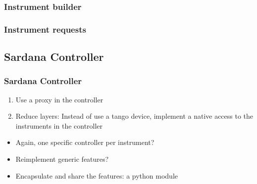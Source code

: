 \documentclass{beamer}
\begin{document}
\begin{frame}
  \frametitle{Instrument builder}
\end{frame}

\begin{frame}
  \frametitle{Instrument requests}
\end{frame}

\subsection{Sardana Controller}

\begin{frame}
  \frametitle{Sardana Controller}
  \begin{enumerate}
    \item<2-> Use a proxy in the controller
    \item<3-> Reduce layers: Instead of use a tango device, implement a native access to the instruments in the controller
  \end{enumerate}
  \begin{itemize}
    \item<4-> \alert{Again}, one specific controller per instrument?
    \item<5-> \alert{Reimplement} generic features?
    \item<6-> {\color{green}Encapsulate and share} the features: a python module
  \end{itemize}
\end{frame}
\end{document}
